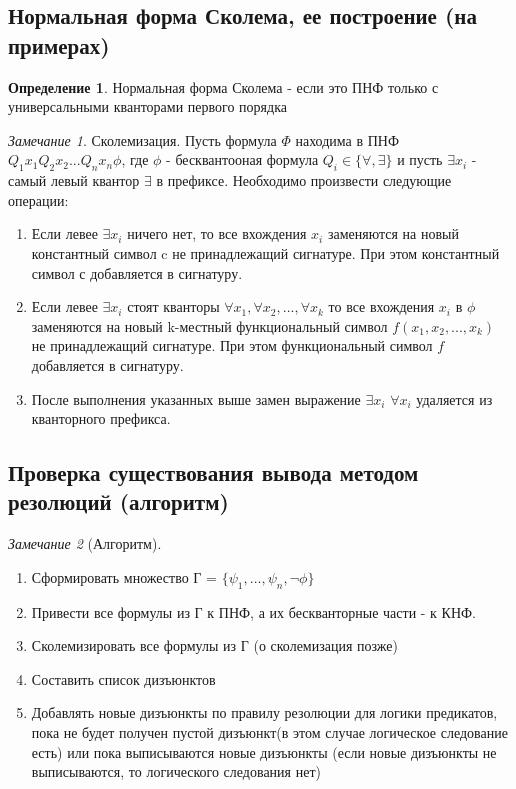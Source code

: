 \documentclass[a4paper]{article}
\theoremstyle{definition}
\newtheorem*{definition}{Определение}
\theoremstyle{remark}
\newtheorem*{remark}{Замечание}
\begin{document}
    \subsection{Нормальная форма Сколема, ее построение (на примерах)}
		\begin{definition}
			Нормальная форма Сколема - если это ПНФ только с универсальными кванторами первого порядка
		\end{definition}
		\begin{remark}
			Сколемизация. Пусть формула $\Phi$ находима в ПНФ $Q_1x_1 Q_2x_2...Q_nx_n\phi$, где $\phi$ - бесквантооная формула $Q_i \in \{\forall, \exists\}$ и пусть $\exists x_i$ - самый левый квантор $\exists$ в префиксе. Необходимо произвести следующие операции:
			\begin{enumerate}
				\item Если левее $\exists x_i$ ничего нет, то все вхождения $x_i$ заменяются на новый константный символ c не принадлежащий сигнатуре. При этом константный символ с добавляется в сигнатуру.
				\item Если левее $\exists x_i$ стоят кванторы $\forall x_1, \forall x_2, ..., \forall x_k$ то все вхождения $x_i$ в $\phi$ заменяются на новый k-местный функциональный символ $f(x_1, x_2, ..., x_k)$ не принадлежащий сигнатуре. При этом функциональный символ $f$ добавляется в сигнатуру.
				\item После выполнения указанных выше замен выражение $\exists x_i$ $\forall x_i$ удаляется из кванторного префикса.
			\end{enumerate}
		\end{remark}
    \subsection{Проверка существования вывода методом резолюций (алгоритм)}
	\begin{remark}[Алгоритм]
		\begin{enumerate}
			\item Сформировать множество Г = $\{\psi_1, ..., \psi_n, \neg \phi\}$
			\item Привести все формулы из Г к ПНФ, а их бескванторные части - к КНФ.
			\item Сколемизировать все формулы из Г (о сколемизация позже)
			\item Составить список дизъюнктов
			\item Добавлять новые дизъюнкты по правилу резолюции для логики предикатов, пока не будет получен пустой дизъюнкт(в этом случае логическое следование есть) или пока выписываются новые дизъюнкты (если новые дизъюнкты не выписываются, то логического следования нет)
		\end{enumerate}
	\end{remark}
\end{document}
